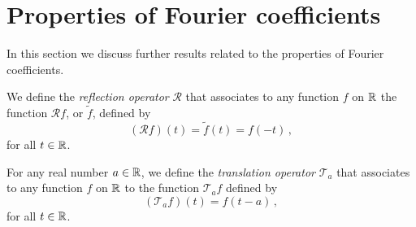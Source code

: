 \section{Properties of Fourier coefficients}
In this section we discuss further results related to the properties of Fourier
coefficients.
\begin{definition}
  We define the \emph{reflection operator} $\mathcal{R}$ that associates to any function
  $f$ on $\mathbb{R}$ the function $\mathcal{R}f$, or $\tilde{f}$, defined by
  \begin{equation}
    (\mathcal{R}f)(t)=\tilde{f}(t)=f(-t)\,,
  \end{equation}
  for all $t\in\mathbb{R}$.
\end{definition}
\begin{definition}
  For any real number $a\in\mathbb{R}$, we define the \emph{translation operator} $\mathcal{T}_a$
  that associates to any function $f$ on $\mathbb{R}$ to the function $\mathcal{T}_af$ defined by
  \begin{equation}
    (\mathcal{T}_af)(t)=f(t-a)\,,
  \end{equation}
  for all $t\in\mathbb{R}$.
\end{definition}

